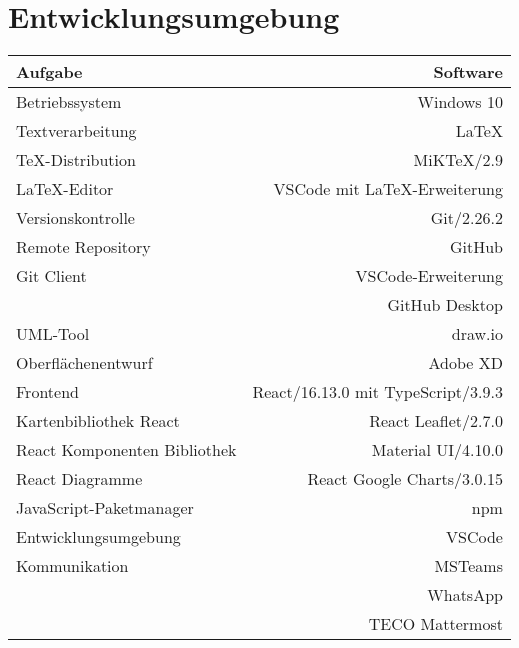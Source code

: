 \section{Entwicklungsumgebung}

\begin{tabular}[htb]{l|r}
    Aufgabe & Software\\
    \hline \hline
    Betriebssystem & Windows 10\\
    \hline
    Textverarbeitung & \LaTeX\\
    TeX-Distribution & MiKTeX/2.9\\
    \LaTeX -Editor & VSCode mit \LaTeX -Erweiterung\\
    \hline
    Versionskontrolle & Git/2.26.2\\
    Remote Repository & GitHub\\
    Git Client & VSCode-Erweiterung\\
    & GitHub Desktop\\
    UML-Tool & draw.io\\
    Oberflächenentwurf & Adobe XD\\
    \hline
    Frontend & React/16.13.0 mit TypeScript/3.9.3\\
    Kartenbibliothek React & React Leaflet/2.7.0\\
    React Komponenten Bibliothek & Material UI/4.10.0\\
    React Diagramme & React Google Charts/3.0.15\\
    JavaScript-Paketmanager & npm\\
    Entwicklungsumgebung & VSCode\\
    \hline
    Kommunikation & MSTeams\\
    & WhatsApp\\
    & TECO Mattermost\\
\end{tabular}    
